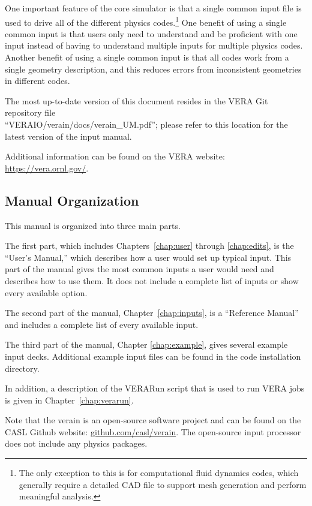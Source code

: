 One important feature of the core simulator is that a single common input file is used to drive all
of the different physics codes.\footnote{The only exception to this is for computational fluid dynamics codes,
which generally require a detailed CAD file to support mesh generation and perform meaningful analysis.}
One benefit of using a single common input is that users only need to understand and be proficient with one input
instead of having to understand multiple inputs for multiple physics codes.
Another benefit of using a single common input is that all codes work from a single
geometry description, and this reduces errors from inconsistent geometries in different codes.

The most up-to-date version of this document resides in the VERA Git repository file\\
``VERAIO/verain/docs/verain\_UM.pdf'';
please refer to this location for the latest version of the input manual.

Additional information can be found on the VERA website: \href{https://vera.ornl.gov/}{https://vera.ornl.gov/}.

\subsection{Manual Organization}

This manual is organized into three main parts.

The first part, which includes Chapters~\ref{chap:user} through \ref{chap:edits}, is the ``User's Manual,''
which describes how a user would set up typical input. This part of the manual gives
the most common inputs a user would need and describes how to use them.
It does not include a complete list of inputs or show every available option.

The second part of the manual, Chapter~\ref{chap:inputs}, is a ``Reference Manual'' and includes
a complete list of every available input.

The third part of the manual, Chapter \ref{chap:example}, gives several example input decks.
Additional example input files can be found in the code installation directory.

In addition, a description of the VERARun script that is used to run VERA jobs is given in Chapter~\ref{chap:verarun}.

Note that the \ac{verain} is an open-source software project and can be
found on the CASL Github website: \href{http://www.github.com/casl/verain}{github.com/casl/verain}.
The open-source input processor does not include any physics packages.


